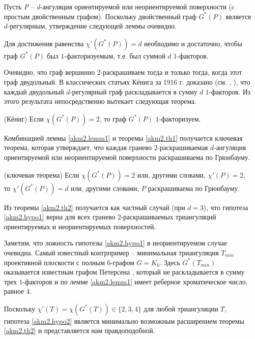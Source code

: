 Пусть \textit{P} -- \textit{d}-ангуляция ориентируемой или неориентируемой поверхности (c простым двойственным графом). Поскольку двойственный граф  $G^*(P)$  является $d$-регулярным, утверждение следующей леммы очевидно.

\begin{lemma}
\label{akm2.lemm1}
Для достижения равенства $\chi '(G^*(P)) = d$ необходимо и достаточно, чтобы граф $G^*(P)$ был $1$-факторизуемым, т.е. был суммой $d$ $1$-факторов.
\end{lemma}


Очевидно, что граф вершинно $2$-раскрашиваем тогда и только тогда, когда этот граф двудольный. В классических статьях Кёнига за 1916 г. доказано (см. \cite{lit05}, \cite{konigD}), что каждый двудольный $d$-регулярный граф раскладывается в сумму $d$ $1$-факторов. Из этого результата непосредственно вытекает следующая теорема.

\begin{theorem}
\label{akm2.th1}
(Кёниг) Если $\chi(G^*(P)) = 2$, то граф $G^*(P)$ $1$-факторизуем.
\end{theorem}

Комбинацией леммы \ref{akm2.lemm1} и теоремы \ref{akm2.th1} получается ключевая теорема, которая утверждает, что каждая гранево $2$-раскрашиваемая $d$-ангуляция ориентируемой или неориентируемой поверхности раскрашиваема по Грюнбауму.

\begin{theorem}
\label{akm2.th2}
(ключевая теорема) Если $\chi (G^*(P)) = 2$ или, другими словами, $\chi ' (P) = 2$, то $\chi '(G^*(P)) = d$ или, другими словами, $P$ раскрашиваема по Грюнбауму.
\end{theorem}

Из теоремы \ref{akm2.th2} получается как частный случай (при $d = 3$), что гипотеза \ref{akm2.hypo1} верна для всех гранево $2$-раскрашиваемых триангуляций ориентируемых и неориентируемых поверхностей.

Заметим, что ложность гипотезы \ref{akm2.hypo1} в неориентируемом случае очевидна. Самый известный контрпример \cite{archdea1} -- минимальная триангуляция $T_{min}$ проективной плоскости с полным $6$-графом $G = K_6$. Здесь $G^*(T_{min})$ оказывается известным графом Петерсена \cite{petersen}, который не раскладывается в сумму трех $1$-факторов \cite{harary, lit05, petersen} и по лемме \eqref{akm2.lemm1} имеет реберное хроматическое число, равное $4$.

Поскольку $\chi '(T) =  \chi (G^*(T)) \in  \{2, 3, 4\}$ для любой триангуляции $T$, гипотеза \ref{akm2.hypo2} является минимально возможным расширением теоремы \ref{akm2.th2} и представляется нам правдоподобной.

